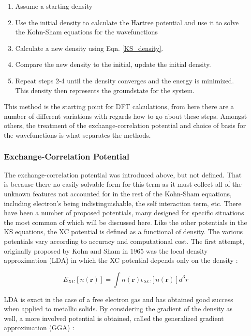 \begin{enumerate}
	\item Assume a starting density
	\item Use the initial density to calculate the Hartree potential and use it to solve the Kohn-Sham equations for the wavefunctions
	\item Calculate a new density using Eqn. \ref{KS_density}.
	\item Compare the new density to the initial, update the initial density. 
	\item Repeat steps 2-4 until the density converges and the energy is minimized. This density then represents the groundstate for the system.
\end{enumerate}

This method is the starting point for DFT calculations, from here there are a number of different variations with regards how to go about these steps.  Amongst others, the treatment of the exchange-correlation potential and choice of basis for the wavefunctions is what separates the methods.  


\subsubsection{Exchange-Correlation Potential}
The exchange-correlation potential was introduced above, but not defined.  That is because there no easily solvable form for this term as it must collect all of the unknown features not accounted for in the rest of the Kohn-Sham equations, including electron's being indistinguishable, the self interaction term, etc.   There have been a number of proposed potentials, many designed for specific situations the most common of which will be discussed here.  Like the other potentials in the KS equations, the XC potential is defined as a functional of density.  The various potentials vary according to accuracy and computational cost.  The first attempt, originally proposed by Kohn and Sham in 1965 was the local density approximation (LDA) in which the XC potential depends only on the density \cite{tao_climbing_2003, ks_1965}: 

\begin{equation}
	E_{\mathrm{XC}}[n(\textbf{r})] = \int  n(\textbf{r}) \epsilon_{\mathrm{XC}}[n(\textbf{r})] d^3r
\end{equation}

LDA is exact in the case of a free electron gas and has obtained good success when applied to metallic solids.  By considering the gradient of the density as well, a more involved potential is obtained, called the generalized gradient approximation (GGA) \cite{tao_climbing_2003,perdew_wang} : 


